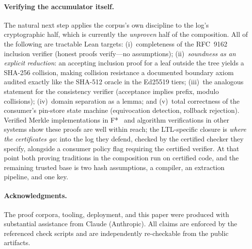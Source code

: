 \documentclass[10pt,twocolumn]{article}
\begin{document}
\paragraph{Verifying the accumulator itself.} The natural next step
applies the corpus's own discipline to the log's cryptographic half,
which is currently the \emph{unproven} half of the composition. All of
the following are tractable Lean targets: (i)~completeness of the
RFC~9162 inclusion verifier (honest proofs verify---no assumptions);
(ii)~\emph{soundness as an explicit reduction}: an accepting inclusion
proof for a leaf outside the tree yields a SHA-256 collision, making
collision resistance a documented boundary axiom audited exactly like
the SHA-512 oracle in the Ed25519 tiers; (iii)~the analogous statement
for the consistency verifier (acceptance implies prefix, modulo
collisions); (iv)~domain separation as a lemma; and (v)~total
correctness of the consumer's pin-store state machine (equivocation
detection, rollback rejection). Verified Merkle implementations in
F*~\cite{evercrypt} and algorithm verifications in other systems show
these proofs are well within reach; the LTL-specific closure is
\emph{where the certificates go}: into the log they defend, checked by
the certified checker they specify, alongside a consumer policy flag
requiring the certified verifier. At that point both proving traditions
in the composition run on certified code, and the remaining trusted base
is two hash assumptions, a compiler, an extraction pipeline, and one
key.

\paragraph*{Acknowledgments.} The proof corpora, tooling, deployment,
and this paper were produced with substantial assistance from Claude
(Anthropic). All claims are enforced by the referenced check scripts and
are independently re-checkable from the public artifacts.
\end{document}
